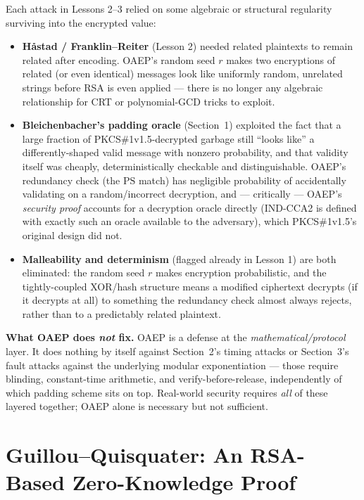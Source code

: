 \begin{remark}
Each attack in Lessons 2--3 relied on some algebraic or structural regularity surviving into the encrypted value:
\begin{itemize}
\item \textbf{Håstad / Franklin--Reiter} (Lesson 2) needed related plaintexts to remain related after encoding. OAEP's random seed $r$ makes two encryptions of related (or even identical) messages look like uniformly random, unrelated strings before RSA is even applied — there is no longer any algebraic relationship for CRT or polynomial-GCD tricks to exploit.
\item \textbf{Bleichenbacher's padding oracle} (Section~1) exploited the fact that a large fraction of PKCS\#1v1.5-decrypted garbage still ``looks like'' a differently-shaped valid message with nonzero probability, and that validity itself was cheaply, deterministically checkable and distinguishable. OAEP's redundancy check (the $\text{PS}$ match) has negligible probability of accidentally validating on a random/incorrect decryption, and — critically — OAEP's \emph{security proof} accounts for a decryption oracle directly (IND-CCA2 is defined with exactly such an oracle available to the adversary), which PKCS\#1v1.5's original design did not.
\item \textbf{Malleability and determinism} (flagged already in Lesson 1) are both eliminated: the random seed $r$ makes encryption probabilistic, and the tightly-coupled XOR/hash structure means a modified ciphertext decrypts (if it decrypts at all) to something the redundancy check almost always rejects, rather than to a predictably related plaintext.
\end{itemize}
\end{remark}

\medskip\noindent\textbf{What OAEP does \emph{not} fix.} OAEP is a defense at the \emph{mathematical/protocol} layer. It does nothing by itself against Section~2's timing attacks or Section~3's fault attacks against the underlying modular exponentiation — those require blinding, constant-time arithmetic, and verify-before-release, independently of which padding scheme sits on top. Real-world security requires \emph{all} of these layered together; OAEP alone is necessary but not sufficient.

\newpage
\section{Guillou--Quisquater: An RSA-Based Zero-Knowledge Proof}

